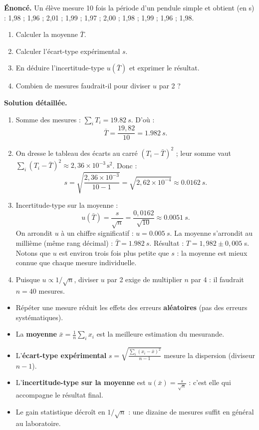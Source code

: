 \documentclass[11pt]{article}
\begin{document}
\begin{exoresolu}
\textbf{Énoncé.} Un élève mesure 10 fois la période d'un pendule simple et obtient (en s) : 1,98 ; 1,96 ; 2,01 ; 1,99 ; 1,97 ; 2,00 ; 1,98 ; 1,99 ; 1,96 ; 1,98.
\begin{enumerate}
\item Calculer la moyenne $\bar{T}$.
\item Calculer l'écart-type expérimental $s$.
\item En déduire l'incertitude-type $u(\bar{T})$ et exprimer le résultat.
\item Combien de mesures faudrait-il pour diviser $u$ par 2 ?
\end{enumerate}
\tcblower
\textbf{Solution détaillée.}
\begin{enumerate}
\item Somme des mesures : $\sum_i T_i = \SI{19,82}{s}$. D'où :
\[
\bar{T} = \frac{19,82}{10} = \SI{1,982}{s}.
\]
\item On dresse le tableau des écarts au carré $(T_i - \bar{T})^2$ ; leur somme vaut $\sum_i (T_i - \bar{T})^2 \approx 2,36 \times 10^{-3}\,\text{s}^2$. Donc :
\[
s = \sqrt{\frac{2,36\times 10^{-3}}{10-1}} = \sqrt{2,62\times 10^{-4}} \approx \SI{0,0162}{s}.
\]
\item Incertitude-type sur la moyenne :
\[
u(\bar{T}) = \frac{s}{\sqrt{n}} = \frac{0,0162}{\sqrt{10}} \approx \SI{0,0051}{s}.
\]
On arrondit $u$ à un chiffre significatif : $u = \SI{0,005}{s}$. La moyenne s'arrondit au millième (même rang décimal) : $\bar{T} = \SI{1,982}{s}$.
Résultat : $T = 1{,}982 \pm 0{,}005$ s. Notons que $u$ est environ trois fois plus petite que $s$ : la moyenne est mieux connue que chaque mesure individuelle.
\item Puisque $u \propto 1/\sqrt{n}$, diviser $u$ par 2 exige de multiplier $n$ par 4 : il faudrait $n = 40$ mesures.
\end{enumerate}
\end{exoresolu}

\begin{aretenir}
\begin{itemize}
\item Répéter une mesure réduit les effets des erreurs \textbf{aléatoires} (pas des erreurs systématiques).
\item La \textbf{moyenne} $\bar{x} = \frac{1}{n}\sum_i x_i$ est la meilleure estimation du mesurande.
\item L'\textbf{écart-type expérimental} $s = \sqrt{\frac{\sum_i (x_i-\bar{x})^2}{n-1}}$ mesure la dispersion (diviseur $n-1$).
\item L'\textbf{incertitude-type sur la moyenne} est $u(\bar{x}) = \frac{s}{\sqrt{n}}$ : c'est elle qui accompagne le résultat final.
\item Le gain statistique décroît en $1/\sqrt{n}$ : une dizaine de mesures suffit en général au laboratoire.
\end{itemize}
\end{aretenir}
\end{document}
